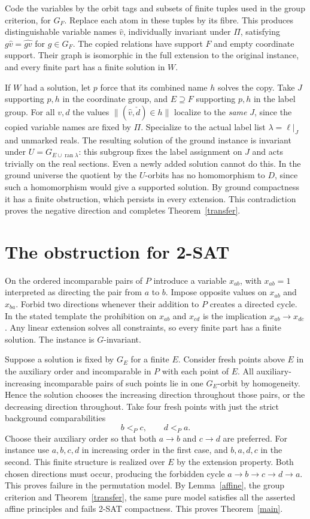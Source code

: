 \documentclass[11pt]{article}
\begin{document}
Code the variables by the orbit tags and subsets of finite tuples used in the group criterion, for $G_F$. Replace each atom in these tuples by its fibre. This produces distinguishable variable names $\widehat v$, individually invariant under $\Pi$, satisfying $g\widehat v=\widehat{gv}$ for $g\in G_F$. The copied relations have support $F$ and empty coordinate support. Their graph is isomorphic in the full extension to the original instance, and every finite part has a finite solution in $W$.

If $W$ had a solution, let $p$ force that its combined name $h$ solves the copy. Take $J$ supporting $p,h$ in the coordinate group, and $E\supseteq F$ supporting $p,h$ in the label group. For all $v,d$ the values $\|(\widehat v,\check d)\in h\|$ localize to the \emph{same} $J$, since the copied variable names are fixed by $\Pi$. Specialize to the actual label list $\lambda=\ell|_J$ and unmarked reals. The resulting solution of the ground instance is invariant under $U=G_{E\cup\operatorname{ran}\lambda}$: this subgroup fixes the label assignment on $J$ and acts trivially on the real sections. Even a newly added solution cannot do this. In the ground universe the quotient by the $U$-orbits has no homomorphism to $D$, since such a homomorphism would give a supported solution. By ground compactness it has a finite obstruction, which persists in every extension. This contradiction proves the negative direction and completes Theorem~\ref{transfer}.

\section{The obstruction for 2-SAT}
On the ordered incomparable pairs of $P$ introduce a variable $x_{ab}$, with $x_{ab}=1$ interpreted as directing the pair from $a$ to $b$. Impose opposite values on $x_{ab}$ and $x_{ba}$. Forbid two directions whenever their addition to $P$ creates a directed cycle. In the stated template the prohibition on $x_{ab}$ and $x_{cd}$ is the implication $x_{ab}\to x_{dc}$. Any linear extension solves all constraints, so every finite part has a finite solution. The instance is $G$-invariant.

Suppose a solution is fixed by $G_E$ for a finite $E$. Consider fresh points above $E$ in the auxiliary order and incomparable in $P$ with each point of $E$. All auxiliary-increasing incomparable pairs of such points lie in one $G_E$-orbit by homogeneity. Hence the solution chooses the increasing direction throughout those pairs, or the decreasing direction throughout. Take four fresh points with just the strict background comparabilities
\[
                       b<_P c,\qquad d<_P a.
\]
Choose their auxiliary order so that both $a\to b$ and $c\to d$ are preferred. For instance use $a,b,c,d$ in increasing order in the first case, and $b,a,d,c$ in the second. This finite structure is realized over $E$ by the extension property. Both chosen directions must occur, producing the forbidden cycle $a\to b\to c\to d\to a$. This proves failure in the permutation model. By Lemma~\ref{affine}, the group criterion and Theorem~\ref{transfer}, the same pure model satisfies all the asserted affine principles and fails 2-SAT compactness. This proves Theorem~\ref{main}.
\end{document}
